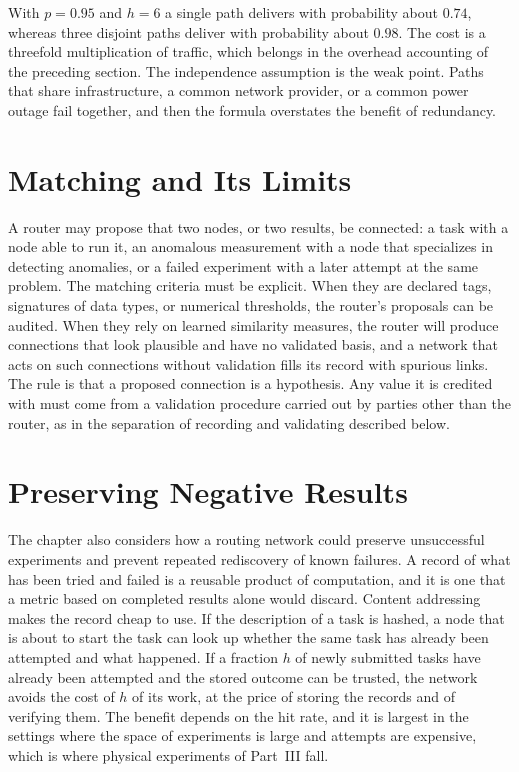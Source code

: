With $p=0.95$ and $h=6$ a single path delivers with probability about $0.74$, whereas three disjoint paths deliver with probability about $0.98$. The cost is a threefold multiplication of traffic, which belongs in the overhead accounting of the preceding section. The independence assumption is the weak point. Paths that share infrastructure, a common network provider, or a common power outage fail together, and then the formula overstates the benefit of redundancy.

\section{Matching and Its Limits}

A router may propose that two nodes, or two results, be connected: a task with a node able to run it, an anomalous measurement with a node that specializes in detecting anomalies, or a failed experiment with a later attempt at the same problem. The matching criteria must be explicit. When they are declared tags, signatures of data types, or numerical thresholds, the router's proposals can be audited. When they rely on learned similarity measures, the router will produce connections that look plausible and have no validated basis, and a network that acts on such connections without validation fills its record with spurious links. The rule is that a proposed connection is a hypothesis. Any value it is credited with must come from a validation procedure carried out by parties other than the router, as in the separation of recording and validating described below.

\section{Preserving Negative Results}

The chapter also considers how a routing network could preserve unsuccessful experiments and prevent repeated rediscovery of known failures. A record of what has been tried and failed is a reusable product of computation, and it is one that a metric based on completed results alone would discard. Content addressing makes the record cheap to use. If the description of a task is hashed, a node that is about to start the task can look up whether the same task has already been attempted and what happened. If a fraction $h$ of newly submitted tasks have already been attempted and the stored outcome can be trusted, the network avoids the cost of $h$ of its work, at the price of storing the records and of verifying them. The benefit depends on the hit rate, and it is largest in the settings where the space of experiments is large and attempts are expensive, which is where physical experiments of Part~III fall.

